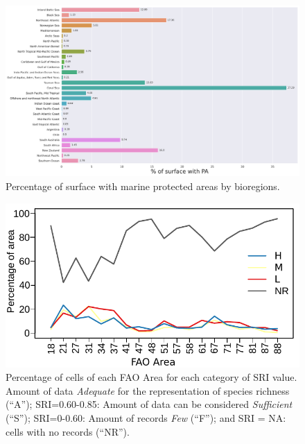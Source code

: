 \documentclass[12pt,authoryear]{elsarticle}
\begin{document}
\begin{figure}[h]
  \centering
  \includegraphics[width=1.0\textwidth]{FigS3}
    \caption{Percentage of surface with marine protected areas by bioregions.
    \label{fig:FigS3}
  }
\end{figure}

\begin{figure}[h]
  \centering
  \includegraphics[width=.95\textwidth]{FigS4}
    \caption{Percentage of cells of each FAO Area for each category of SRI value. Amount of data \textit{Adequate} for the representation of species richness (``A''); SRI=0.60-0.85: Amount of data can be considered \textit{Sufficient} (``S''); SRI=0-0.60: Amount of records \textit{Few} (``F''); and SRI = NA: cells with no records (``NR'').
    \label{fig:FigS4}
  }
\end{figure}
\end{document}
